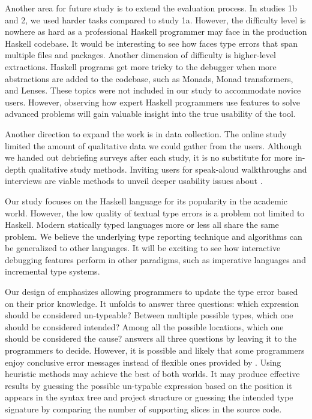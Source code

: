 Another area for future study is to extend the evaluation process. In studies 1b and 2, we used harder tasks compared to study 1a. However, the difficulty level is nowhere as hard as a professional Haskell programmer may face in the production Haskell codebase. It would be interesting to see how \chameleon{}  faces type errors that span multiple files and packages. Another dimension of difficulty is higher-level extractions. Haskell programs get more tricky to the debugger when more abstractions are added to the codebase, such as Monads, Monad transformers, and Lenses. These topics were not included in our study to accommodate novice users. However, observing how expert Haskell programmers use \chameleon{} features to solve advanced problems will gain valuable insight into the true usability of the tool.

Another direction to expand the work is in data collection. The online study limited the amount of qualitative data we could gather from the users. Although we handed out debriefing surveys after each study, it is no substitute for more in-depth qualitative study methods. Inviting users for speak-aloud walkthroughs and interviews are viable methods to unveil deeper usability issues about \chameleon{}.

Our study focuses on the Haskell language for its popularity in the academic world. However, the low quality of textual type errors is a problem not limited to Haskell. Modern statically typed languages more or less all share the same problem. We believe the underlying type reporting technique and algorithms can be generalized to other languages. It will be exciting to see how interactive debugging features perform in other paradigms, such as  imperative languages and incremental type systems.

Our design of \chameleon{}  emphasizes allowing programmers to update the type error based on their prior knowledge. It unfolds to answer three questions: which expression should be considered un-typeable? Between multiple possible types, which one should be considered intended? Among all the possible locations, which one should be considered the cause? \chameleon{} answers all three questions by leaving it to the programmers to decide. However, it is possible and likely that some programmers enjoy conclusive error messages instead of flexible ones provided by \chameleon{}. Using heuristic methods may achieve the best of both worlds. It may produce effective results by guessing the possible un-typable expression based on the position it appears in the syntax tree and project structure or guessing the intended type signature by comparing the number of supporting slices in the source code.
